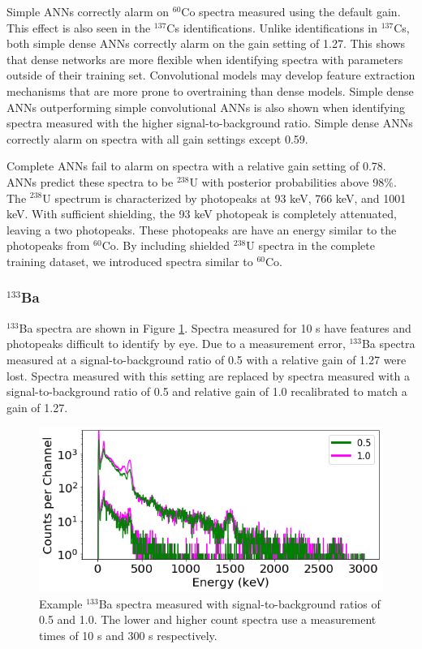 Simple ANNs correctly alarm on $^{60}$Co spectra measured using the default gain. This effect is also seen in the $^{137}$Cs identifications. Unlike identifications in $^{137}$Cs, both simple dense ANNs correctly alarm on the gain setting of 1.27. This shows that dense networks are more flexible when identifying spectra with parameters outside of their training set. Convolutional models may develop feature extraction mechanisms that are more prone to overtraining than dense models. Simple dense ANNs outperforming simple convolutional ANNs is also shown when identifying spectra measured with the higher signal-to-background ratio. Simple dense ANNs correctly alarm on spectra with all gain settings except 0.59.

Complete ANNs fail to alarm on spectra with a relative gain setting of 0.78. ANNs predict these spectra to be $^{238}$U with posterior probabilities above 98\%. The $^{238}$U spectrum is characterized by photopeaks at 93 keV, 766 keV, and 1001 keV. With sufficient shielding, the 93 keV photopeak is completely attenuated, leaving a two photopeaks. These photopeaks are have an energy similar to the photopeaks from $^{60}$Co. By including shielded $^{238}$U spectra in the complete training dataset, we introduced spectra similar to $^{60}$Co. 


\subsubsection{$^{133}$Ba}

$^{133}$Ba spectra are shown in Figure \ref{fig:realspectra-cal-ba133-spec}. Spectra measured for 10 s have features and photopeaks difficult to identify by eye. Due to a measurement error, $^{133}$Ba spectra measured at a signal-to-background ratio of 0.5 with a relative gain of 1.27 were lost. Spectra measured with this setting are replaced by spectra measured with a signal-to-background ratio of 0.5 and relative gain of 1.0 recalibrated to match a gain of 1.27.

\begin{figure}[H]
	\centering
	\includegraphics[width=0.85\linewidth]{images/realspectra-cal-ba133-spec}
	\caption{Example $^{133}$Ba spectra measured with signal-to-background ratios of 0.5 and 1.0. The lower and higher count spectra use a measurement times of 10 s and 300 s respectively.}
	\label{fig:realspectra-cal-ba133-spec}
\end{figure}

